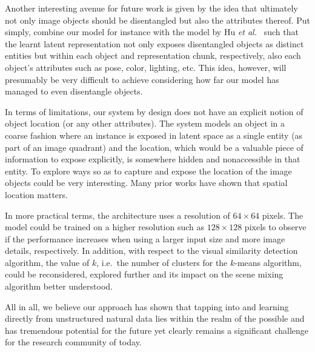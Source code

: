 \documentclass[a4paper,12pt]{report}
\begin{document}
Another interesting avenue for future work is given by the idea that ultimately not only image objects should be disentangled but also the attributes thereof. Put simply, combine our model for instance with the model by Hu \textit{et al.}~\cite{DisentFacOfVarByMixTh} such that the learnt latent representation not only exposes disentangled objects as distinct entities but within each object and representation chunk, respectively, also each object's attributes such as pose, color, lighting, etc. This idea, however, will presumably be very difficult to achieve considering how far our model has managed to even disentangle objects.

In terms of limitations, our system by design does not have an explicit notion of object location (or any other attributes). The system models an object in a coarse fashion where an instance is exposed in latent space as a single entity (as part of an image quadrant) and the location, which would be a valuable piece of information to expose explicitly, is somewhere hidden and nonaccessible in that entity. To explore ways so as to capture and expose the location of the image objects could be very interesting. Many prior works have shown that spatial location matters.

In more practical terms, the architecture uses a resolution of $64 \times 64$ pixels. The model could be trained on a higher resolution such as $128 \times 128$ pixels to observe if the performance increases when using a larger input size and more image details, respectively. In addition, with respect to the visual similarity detection algorithm, the value of $k$, i.e.\ the number of clusters for the $k$-means algorithm, could be reconsidered, explored further and its impact on the scene mixing algorithm better understood.

\vspace{5mm}
All in all, we believe our approach has shown that tapping into and learning directly from unstructured natural data lies within the realm of the possible and has tremendous potential for the future yet clearly remains a significant challenge for the research community of today.




\end{document}
